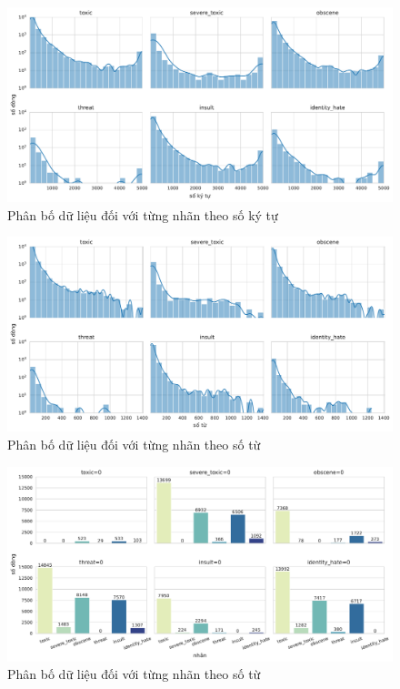 \begin{figure}[htb!]
    \centering
    \includegraphics[width=\textwidth]{chapter_2/image/dist_num_chars_per_label.pdf}
    \caption{Phân bố dữ liệu đối với từng nhãn theo số ký tự}
\end{figure}
\begin{figure}[htb!]
    \centering
    \includegraphics[width=\textwidth]{chapter_2/image/dist_num_words_per_label.pdf}
    \caption{Phân bố dữ liệu đối với từng nhãn theo số từ}
\end{figure}
\begin{figure}[htb!]
    \centering
    \includegraphics[width=\textwidth]{chapter_2/image/num_records_per_label_without_one_label.pdf}
    \caption{Phân bố dữ liệu đối với từng nhãn theo số từ}
\end{figure}

